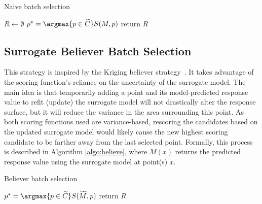 {\fontsize{10}{10}\selectfont
\begin{algorithm}
\scriptsize
\caption{Naive batch selection}
\label{algo:naive}
\begin{algorithmic}
  \State $R \gets \emptyset$
  \State $p^* = \argmax{p \in \widetilde{C}} S(M, p)$
  \EndWhile
  \State return $R$
\EndProcedure
\end{algorithmic}
\end{algorithm}
}

\subsection{Surrogate Believer Batch Selection}
This strategy is inspired by the Kriging believer strategy~\cite{GotovosCasatiHitz2013,GinsbourgerLeRicheCarraro2008}.
%
It takes advantage of the scoring function's reliance on the uncertainty of the surrogate model.
%
The main idea is that temporarily adding a point and its model-predicted response value to refit (update) the surrogate model will not drastically alter the response surface, but it will reduce the variance in the area surrounding this point.
%
As both scoring functions used are variance-based, rescoring the candidates based on the updated surrogate model would likely cause the new highest scoring candidate to be farther away from the last selected point.
%
Formally, this process is described in Algorithm \ref{algo:believe}, where $M(x)$ returns the predicted response value using the surrogate model at point(s) $x$.

{\fontsize{10}{10}\selectfont
\begin{algorithm}
\scriptsize
\caption{Believer batch selection}
\label{algo:believe}
\begin{algorithmic}
  \State $p^* = \argmax{p \in \widetilde{C}} S(\widetilde{M}, p)$
\EndWhile
\State return $R$
\EndProcedure
\end{algorithmic}
\end{algorithm}
}

